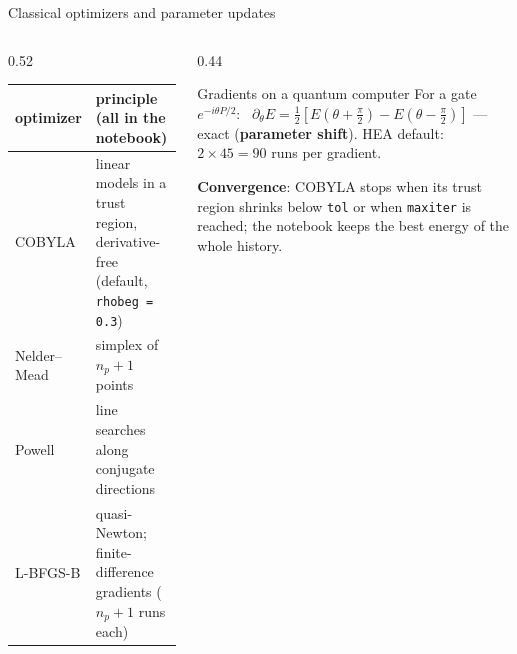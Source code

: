 \documentclass[aspectratio=169,11pt]{beamer}
\newcommand{\key}[1]{{\color{qdark}\textbf{#1}}}
\begin{document}
\begin{frame}{Classical optimizers and parameter updates}
  \begin{columns}[T]
    \begin{column}{0.52\textwidth}
      \small
      \begin{tabular}{p{1.8cm}p{4.6cm}}
        \toprule optimizer & principle (all in the notebook)\\ \midrule
        COBYLA & linear models in a trust region, derivative-free (default, \texttt{rhobeg = 0.3})\\
        Nelder--Mead & simplex of $n_p + 1$ points\\
        Powell & line searches along conjugate directions\\
        L-BFGS-B & quasi-Newton; finite-difference gradients ($n_p + 1$ runs each)\\ \bottomrule
      \end{tabular}
    \end{column}
    \begin{column}{0.44\textwidth}
      \begin{block}{Gradients on a quantum computer}
        For a gate $e^{-i\theta P/2}$: \ $\partial_\theta E = \tfrac12[E(\theta + \tfrac\pi2) - E(\theta - \tfrac\pi2)]$ --- exact
        (\key{parameter shift}). HEA default: $2\times45 = 90$ runs per gradient.
      \end{block}
      \small \key{Convergence}: COBYLA stops when its trust region shrinks below \texttt{tol} or when \texttt{maxiter} is reached;
      the notebook keeps the best energy of the whole history.
    \end{column}
  \end{columns}
\end{frame}
\end{document}

